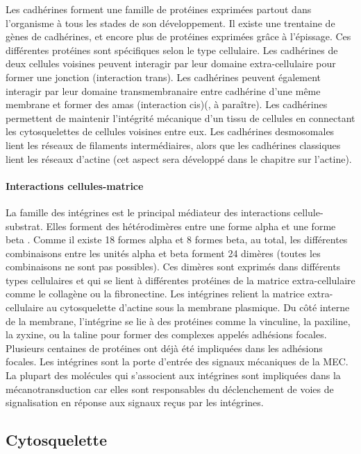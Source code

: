Les cadhérines forment une famille de protéines exprimées partout dans l'organisme à tous les stades de son développement. 
Il existe une trentaine de gènes de cadhérines, et encore plus de protéines exprimées grâce à l'épissage. Ces différentes protéines sont spécifiques selon le type cellulaire.
Les cadhérines de deux cellules voisines peuvent interagir par leur domaine extra-cellulaire pour former une jonction (interaction trans). Les cadhérines peuvent également interagir par leur domaine transmembranaire entre cadhérine d'une même membrane et former des amas (interaction cis)(\cite{Strale}, à paraître). 
Les cadhérines permettent de maintenir l'intégrité mécanique d'un tissu de cellules en connectant les cytosquelettes de cellules voisines entre eux. Les cadhérines desmosomales lient les réseaux de filaments intermédiaires, alors que les cadhérines classiques lient les réseaux d'actine (cet aspect sera développé dans le chapitre sur l'actine). 


\paragraph{Interactions cellules-matrice}

La famille des intégrines est le principal médiateur des interactions cellule-substrat. Elles forment des hétérodimères entre une forme alpha et une forme beta . Comme il existe 18 formes alpha et 8 formes beta, au total, les différentes combinaisons entre les unités alpha et beta forment 24 dimères (toutes les combinaisons ne sont pas possibles).  Ces dimères sont exprimés dans différents types cellulaires et qui se lient à différentes protéines de la matrice extra-cellulaire comme le collagène ou la fibronectine. 
Les intégrines relient la matrice extra-cellulaire au cytosquelette d'actine sous la membrane plasmique. Du côté interne de la membrane, l'intégrine se lie à des protéines comme la vinculine, la paxiline, la zyxine, ou la taline pour former des complexes appelés adhésions focales. Plusieurs centaines de protéines ont déjà été impliquées dans les adhésions focales. 
Les intégrines sont la porte d'entrée des signaux mécaniques de la MEC. La plupart des molécules qui s'associent aux intégrines sont impliquées dans la mécanotransduction car elles sont responsables du déclenchement de voies de signalisation en réponse aux signaux reçus par les intégrines. 

\subsection{Cytosquelette}

